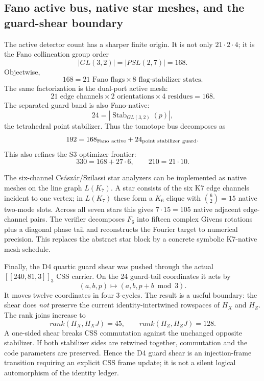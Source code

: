 \subsection{Fano active bus, native star meshes, and the guard-shear boundary}
\label{sec:bt1422-bt1424-fano-native-shear}

The active detector count has a sharper finite origin.  It is not only
\(21\cdot2\cdot4\); it is the Fano collineation group order
\[
|GL(3,2)|=|PSL(2,7)|=168.
\]
Objectwise,
\[
168=21\text{ Fano flags}\times8\text{ flag-stabilizer states}.
\]
The same factorization is the dual-port active mesh:
\[
21\text{ edge channels}\times2\text{ orientations}\times4\text{ residues}=168.
\]
The separated guard band is also Fano-native:
\[
24=|\operatorname{Stab}_{GL(3,2)}(p)|,
\]
the tetrahedral point stabilizer.  Thus the tomotope bus decomposes as
\[
192=168_{\rm Fano\ active}+24_{\rm point\ stabilizer\ guard}.
\]
This also refines the S3 optimizer frontier:
\[
330=168+27\cdot6,
\qquad
210=21\cdot10.
\]

The six-channel Cs\'asz\'ar/Szilassi star analyzers can be implemented as
native meshes on the line graph \(L(K_7)\).  A star consists of the six K7
edge channels incident to one vertex; in \(L(K_7)\) these form a \(K_6\) clique
with \(\binom62=15\) native two-mode slots.  Across all seven stars this gives
\(7\cdot15=105\) native adjacent edge-channel pairs.  The verifier decomposes
\(F_6\) into fifteen complex Givens rotations plus a diagonal phase tail and
reconstructs the Fourier target to numerical precision.  This replaces the
abstract star block by a concrete symbolic K7-native mesh schedule.

Finally, the D4 quartic guard shear was pushed through the actual
\([[240,81,3]]_3\) CSS carrier.  On the 24 guard-tail coordinates it acts by
\[
(a,b,p)\mapsto(a,b,p+b\bmod3).
\]
It moves twelve coordinates in four 3-cycles.  The result is a useful boundary:
the shear does \emph{not} preserve the current identity-intertwined rowspaces
of \(H_X\) and \(H_Z\).  The rank joins increase to
\[
rank(H_X,H_XJ)=45,
\qquad
rank(H_Z,H_ZJ)=128.
\]
A one-sided shear breaks CSS commutation against the unchanged opposite
stabilizer.  If both stabilizer sides are retwined together, commutation and the
code parameters are preserved.  Hence the D4 guard shear is an injection-frame
transition requiring an explicit CSS frame update; it is not a silent logical
automorphism of the identity ledger.
